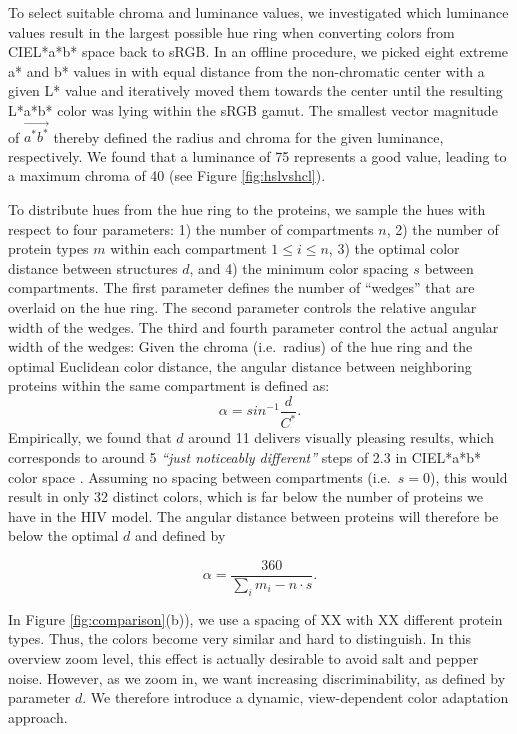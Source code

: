 \documentclass[review,journal]{vgtc}         %
\begin{document}
	To select suitable chroma and luminance values, we investigated which luminance values result in the largest possible hue ring when converting colors from CIEL*a*b* space back to sRGB. 
	In an offline procedure, we picked eight extreme a* and b* values in with equal distance from the non-chromatic center with a given L* value and iteratively moved them towards the center until the resulting L*a*b* color was lying within the sRGB gamut. 
	The smallest vector magnitude of $\vec{a^*b^*}$ thereby defined the radius and chroma for the given luminance, respectively. 
	We found that a luminance of 75 represents a good value, leading to a maximum chroma of 40 (see Figure \ref{fig:hslvshcl}). 
	
	To distribute hues from the hue ring to the proteins, we sample the hues with respect to four parameters: 1) the number of compartments $n$, 2) the number of protein types $m$ within each compartment $1 \leq i \leq n$, 3) the optimal color distance between structures $d$, and 4) the minimum color spacing $s$ between compartments. 
	The first parameter defines the number of ``wedges'' that are overlaid on the hue ring. 
	The second parameter controls the relative angular width of the wedges. 
	The third and fourth parameter control the actual angular width of the wedges: 
	Given the chroma (i.e.\, radius) of the hue ring and the optimal Euclidean color distance, the angular distance between neighboring proteins within the same compartment is defined as: 
	\[
	\alpha = sin^{-1}\frac{d}{C^*}. 
	\]
	Empirically, we found that $d$ around 11 delivers visually pleasing results, which corresponds to around 5 \textit{``just noticeably different''} steps of 2.3 in CIEL*a*b* color space \cite{lee2013perceptually}. 
	Assuming no spacing between compartments (i.e.\, $s=0$), this would result in only 32 distinct colors, which is far below the number of proteins we have in the HIV model. 
	The angular distance between proteins will therefore be below the optimal $d$ and defined by 
	
	\[
	\alpha = \frac{360}{\sum_{i} m_i - n \cdot s}. 
	\]
	
	In Figure \ref{fig:comparison}(b)), we use a spacing of XX with XX different protein types. 
	Thus, the colors become very similar and hard to distinguish. 
	In this overview zoom level, this effect is actually desirable to avoid salt and pepper noise. 
	However, as we zoom in, we want increasing discriminability, as defined by parameter $d$. 
	We therefore introduce a dynamic, view-dependent color adaptation approach. 
	
\end{document}
